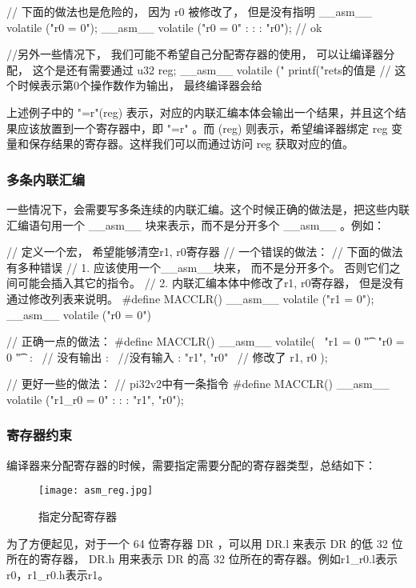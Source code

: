 \begin{myccode}
// 下面的做法也是危险的， 因为 r0 被修改了， 但是没有指明
__asm__ volatile ("r0 = 0");
__asm__ volatile ("r0 = 0" : : : "r0"); // ok

//另外一些情况下， 我们可能不希望自己分配寄存器的使用， 可以让编译器分配， 这个是还有需要通过%
u32 reg;
__asm__ volatile ("%
printf("rets的值是 %
 // 这个时候表示第0个操作数作为输出， 最终编译器会给%
\end{myccode}

上述例子中的 "=r"(reg) 表示，对应的内联汇编本体会输出一个结果，并且这个结果应该放置到一个寄存器中，即 "=r" 。而 (reg) 则表示，希望编译器绑定 reg 变量和保存结果的寄存器。这样我们可以而通过访问 reg 获取对应的值。

\subsubsection{多条内联汇编}
一些情况下，会需要写多条连续的内联汇编。这个时候正确的做法是，把这些内联汇编语句用一个 \_\_asm\_\_ 块来表示，而不是分开多个 \_\_asm\_\_ 。例如：
\begin{myccode}
// 定义一个宏， 希望能够清空r1, r0寄存器
// 一个错误的做法：
// 下面的做法有多种错误
// 1. 应该使用一个__asm__块来， 而不是分开多个。 否则它们之间可能会插入其它的指令。
// 2. 内联汇编本体中修改了r1, r0寄存器， 但是没有通过修改列表来说明。
#define MACCLR() __asm__ volatile ("r1 = 0"); __asm__ volatile ("r0 = 0")

// 正确一点的做法：
#define MACCLR() __asm__ volatile( \
"r1 = 0 \n\t" \
"r0 = 0 \n\t" \
: \ // 没有输出
: \ //没有输入
: "r1", "r0" \ // 修改了 r1, r0
);

// 更好一些的做法：
// pi32v2中有一条指令
#define MACCLR() __asm__ volatile ("r1_r0 = 0" : : : "r1", "r0");
\end{myccode}

\subsubsection{寄存器约束}
编译器来分配寄存器的时候，需要指定需要分配的寄存器类型，总结如下：
\begin{figure}[H]
\centering
\texttt{[image: asm\_reg.jpg]}
\caption{指定分配寄存器}
\label{fig:asm_reg}
\end{figure}
为了方便起见，对于一个 64 位寄存器 DR ，可以用 DR.l 来表示 DR 的低 32 位所在的寄存器， DR.h 用来表示 DR 的高 32 位所在的寄存器。例如r1\_r0.l表示r0，r1\_r0.h表示r1。

